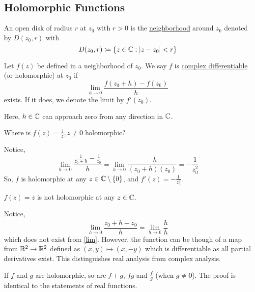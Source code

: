 \documentclass[11pt]{article}
\begin{document}
\subsection{Holomorphic Functions}
\begin{definition}
	An open disk of radius $r$ at $z_0$ with $r>0$ is the
	\underline{neighborhood} around $z_0$ denoted by $D(z_0, r)$ with
	\begin{equation*}
		D(z_0, r) \coloneqq \{z\in\mathbb{C}:|z-z_0|<r\}
	\end{equation*}
\end{definition}
\begin{definition}
	Let $f(z)$ be defined in a neighborhood of $z_0$. We say $f$ is
	\underline{complex differentiable} (or holomorphic) at $z_0$ if
	\begin{equation*}
		\lim_{h\to 0} \frac{f(z_0+h)-f(z_0)}{h}
	\end{equation*}
	exists. If it does, we denote the limit by $f'(z_0)$.
\end{definition}
\begin{remark}
	Here, $h\in\mathbb{C}$ can approach zero from any direction in $\mathbb{C}$.
\end{remark}
\begin{example}
	Where is $f(z) = \frac{1}{z}, z \neq 0$ holomorphic?
\end{example}
Notice,
\begin{equation*}
	\lim_{h\to 0} \frac{\frac{1}{z_0+h}-\frac{1}{z_0}}{h}
	= \lim_{h\to 0} \frac{-h}{(z_0+h)(z_0)}
	= -\frac{1}{z_0^2}
\end{equation*}
So, $f$ is holomorphic at any $z \in \mathbb{C} \setminus \{0\}$, and $f'(z) =
-\frac{1}{z_0^2}$.
\begin{example}
	$f(z) = \bar z$ is not holomorphic at any $z \in \mathbb{C}$.
\end{example}
Notice,
\begin{equation*}
	\lim_{h\to 0} \frac{\bar{z_0+h}-\bar{z_0}}{h}
	= \lim_{h \to 0} \frac{\bar h}{h}
\end{equation*}
which does not exist from \cref{lim}. However, the function can be though of a
map from $\mathbb{R}^2 \to \mathbb{R}^2$ defined as $(x,y) \mapsto (x,-y)$ which is
differentiable as all partial derivatives exist. This distinguishes real
analysis from complex analysis.
\begin{remark}
	If $f$ and $g$ are holomorphic, so are $f+g$, $fg$ and $\frac{f}{g}$ (when
	$g\neq 0$). The proof is identical to the statements of real functions.
\end{remark}
\sectionline
\end{document}
